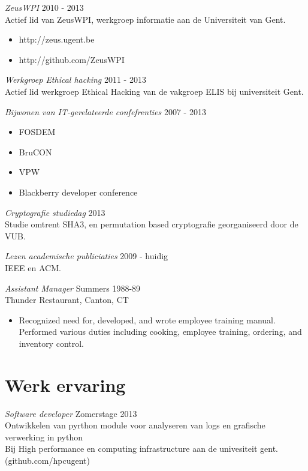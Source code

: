 \documentclass[margin, 10pt]{res} %
\begin{document}
\begin{resume}
{\sl ZeusWPI} \hfill 2010 - 2013 \\
Actief lid van ZeusWPI, werkgroep informatie aan de Universiteit van Gent.
\begin{itemize} \itemsep -2pt
\item{http://zeus.ugent.be}
\item{http://github.com/ZeusWPI}
\end{itemize}

{\sl Werkgroep Ethical hacking} \hfill 2011 - 2013 \\
Actief lid werkgroep Ethical Hacking van de vakgroep ELIS bij universiteit Gent.

{\sl Bijwonen van IT-gerelateerde confefrenties} \hfill 2007 - 2013 \\
\begin{itemize} \itemsep -2pt
\item FOSDEM
\item BruCON
\item VPW
\item Blackberry developer conference
\end{itemize}

{\sl Cryptografie studiedag} \hfill 2013 \\
Studie omtrent SHA3, en permutation based cryptografie georganiseerd door de VUB.

{\sl Lezen academische publiciaties} \hfill 2009 - huidig \\
IEEE en ACM.

{\sl Assistant Manager} \hfill Summers 1988-89 \\
Thunder Restaurant, Canton, CT
\begin{itemize}
\item Recognized need for, developed, and wrote employee training manual. Performed various duties including cooking, employee training, ordering, and inventory control. 
\end{itemize} 
\section{Werk ervaring}
{\sl Software developer} \hfill Zomerstage 2013 \\
Ontwikkelen van pyrthon module voor analyseren van logs en grafische verwerking in python\\
Bij High performance en computing infrastructure aan de univesiteit gent. (github.com/hpcugent)


\end{resume}
\end{document}

